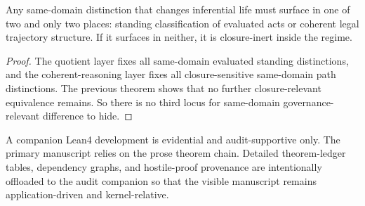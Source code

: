 \begin{corollary}
Any same-domain distinction that changes inferential life must surface in one of two and only two places: standing classification of evaluated acts or coherent legal trajectory structure. If it surfaces in neither, it is closure-inert inside the regime.
\end{corollary}

\begin{proof}
The quotient layer fixes all same-domain evaluated standing distinctions, and the coherent-reasoning layer fixes all closure-sensitive same-domain path distinctions. The previous theorem shows that no further closure-relevant equivalence remains. So there is no third locus for same-domain governance-relevant difference to hide.
\end{proof}

\begin{remark}
A companion Lean4 development is evidential and audit-supportive only. The primary manuscript relies on the prose theorem chain. Detailed theorem-ledger tables, dependency graphs, and hostile-proof provenance are intentionally offloaded to the audit companion so that the visible manuscript remains application-driven and kernel-relative.
\end{remark}
